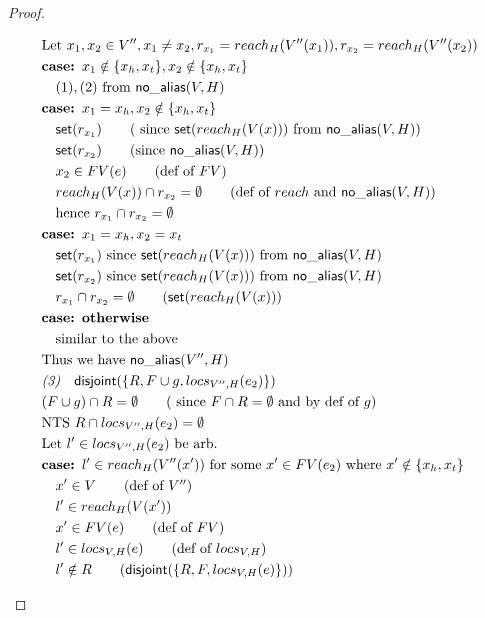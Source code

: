 \documentclass[11pt]{article}
\newcommand{\ms}[1]{\ensuremath{\mathsf{#1}}}
\newcommand{\na}[1]{\mathsf{no\_alias}(#1)}
\newcommand{\dist}[1]{\mathsf{disjoint}(#1)}
\theoremstyle{definition}
\begin{document}
\begin{proof}
\begin{description}
\begin{align*}
  &\text{Let } x_1, x_2 \in V'', x_1 \ne x_2, r_{x_1} = reach_H(V''(x_1)), r_{x_2} = reach_H(V''(x_2))\\
  & \textbf{case: } x_1 \notin \{x_h,x_t\}, x_2 \notin \{x_h,x_t\}\\
  &\quad (1), (2) \text{ from } \na{V,H}\\
  & \textbf{case: } x_1 = x_h, x_2 \notin \{x_h,x_t\}\\
  &\quad \ms{set}(r_{x_1}) \tag{ since $\ms{set}(reach_H(V(x)))$ from  $\na{V,H}$}\\
  &\quad \ms{set}(r_{x_2}) \tag{since  $\na{V,H}$}\\
  &\quad x_2 \in FV(e) \tag{def of $FV$}\\
  &\quad reach_H(V(x)) \cap r_{x_2} = \emptyset \tag{def of $reach$ and $\na{V,H}$}\\
  &\quad \text{hence } r_{x_1} \cap r_{x_2} = \emptyset\\
  &\textbf{case: } x_1 = x_h, x_2 = x_t\\
  &\quad \ms{set}(r_{x_1}) \text{ since } \ms{set}(reach_{H}(V(x))) \text{ from } \na{V,H}\\
  &\quad \ms{set}(r_{x_2}) \text{ since } \ms{set}(reach_H(V(x))) \text{ from } \na{V,H}\\
  &\quad r_{x_1} \cap r_{x_2} = \emptyset \tag{$\ms{set}(reach_H(V(x))$}\\
  & \textbf{case: otherwise} \\
  &\quad \text{similar to the above}\\
  &\text{Thus we have } \na{V'',H}\\
  &\emph{(3)}\quad \dist{\{R,F \cup g,locs_{V'',H}(e_2)\}}\\
  &(F \cup g) \cap R = \emptyset \tag{ since $F \cap R = \emptyset$ and by def of $g$}\\
  &\text{NTS } R \cap locs_{V'',H}(e_2) = \emptyset\\
  &\text{Let } l' \in locs_{V'',H}(e_2) \text{ be arb.}\\
  &\textbf{case: }  l' \in reach_{H}(V''(x')) \text{ for some $x' \in FV(e_2)$ where } x' \notin \{x_h,x_t\}\\
  &\quad x' \in V \tag{def of $V''$}\\
  &\quad l' \in reach_{H}(V(x'))\\
  &\quad x' \in FV(e) \tag{def of $FV$}\\
  &\quad l' \in locs_{V,H}(e) \tag{def of $locs_{V,H}$}\\
  &\quad l' \notin R \tag{$\dist{\{R,F,locs_{V,H}(e)\}}$}\\

\end{align*}
\end{description}
\end{proof}
\end{document}

